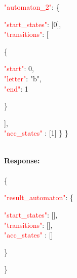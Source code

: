    \begin{adjustwidth}{7.5 mm}{0 cm}

   \textcolor{red}{"automaton\_2"}: \{
     \begin{adjustwidth}{7.5 mm}{0 cm}
            \textcolor{red}{"start\_states"}: [0],\\
            \textcolor{red}{"transitions"}: [
            \begin{adjustwidth}{7.5 mm}{0 cm}
            \{
               \begin{adjustwidth}{7.5 mm}{0 cm}
                    \textcolor{red}{"start"}: 0,\\
                    \textcolor{red}{"letter"}: "b",\\
                    \textcolor{red}{"end"}: 1
               \end{adjustwidth}
            \}
            \end{adjustwidth}
            ],\\
        \textcolor{red}{"acc\_states" }: [1]  \} \}
    \end{adjustwidth}
\end{adjustwidth}
\ \\
\textbf{Response:}\\
\ \\
 \{
 \begin{adjustwidth}{7.5 mm}{0 cm}
    \textcolor{red}{"result\_automaton"}: \{
        \begin{adjustwidth}{7.5 mm}{0 cm}
            \textcolor{red}{"start\_states"}: [],\\
            \textcolor{red}{"transitions"}: [],\\
        \textcolor{red}{"acc\_states" }: []
    \end{adjustwidth}
    \}
\end{adjustwidth}
\}

